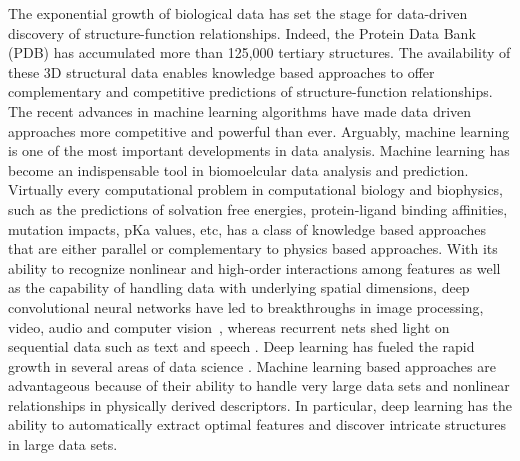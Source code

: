\documentclass[10pt]{article}
\begin{document}
The exponential growth of biological data has set the stage for data-driven  discovery of structure-function relationships. Indeed,  the Protein Data Bank (PDB) has   accumulated  more than 125,000  tertiary structures.  The availability of these 3D structural data  enables knowledge based approaches to offer  complementary and  competitive predictions of  structure-function relationships.  
 The recent advances in machine learning algorithms  have made data driven approaches more  competitive and powerful than ever. Arguably, machine learning is one of the most important developments in data analysis.  
Machine learning has become an indispensable tool in biomoelcular data analysis and prediction. Virtually every computational problem in computational biology and biophysics, such as the predictions of solvation free energies,  protein-ligand  binding affinities, mutation impacts, pKa values, etc,  has a class of knowledge based approaches that are either parallel or complementary to physics based approaches. 
With its ability to recognize nonlinear and high-order interactions among features as well as the capability of handling data with underlying spatial dimensions, deep convolutional neural networks have led to breakthroughs in image processing, video, audio and computer vision~\cite{krizhevsky2012imagenet,simonyan2014very},    whereas recurrent nets  shed light on sequential data such as text and speech \cite{lecun2015deep,hinton2012deep,schmidhuber2015deep,ngiam2011multimodal}. 
Deep learning has fueled the rapid growth in several areas of data science \cite{schmidhuber2015deep,lecun2015deep,ngiam2011multimodal}.
Machine learning based approaches are advantageous because of their ability to handle very large data sets and nonlinear relationships in physically derived descriptors. In particular, deep learning has the ability to automatically extract optimal features and discover intricate structures in large data sets.
  
\end{document}
